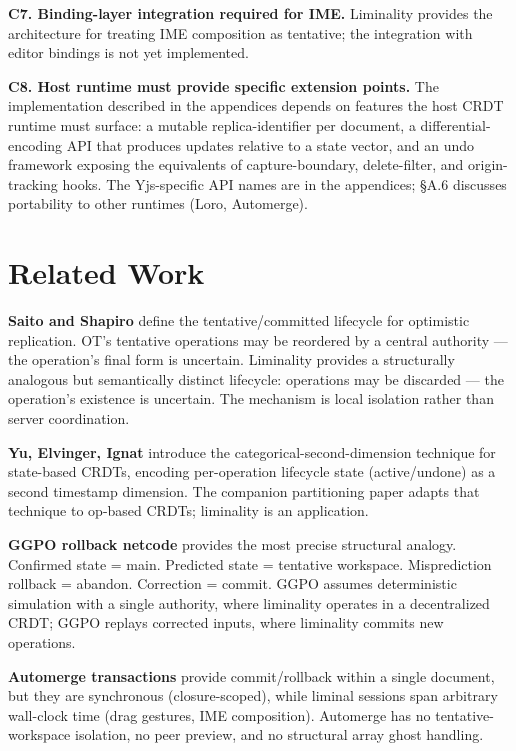 \textbf{C7. Binding-layer integration required for IME.} Liminality provides the architecture for treating IME composition as tentative; the integration with editor bindings is not yet implemented.

\textbf{C8. Host runtime must provide specific extension points.} The implementation described in the appendices depends on features the host CRDT runtime must surface: a mutable replica-identifier per document, a differential-encoding API that produces updates relative to a state vector, and an undo framework exposing the equivalents of capture-boundary, delete-filter, and origin-tracking hooks. The Yjs-specific API names are in the appendices; \S A.6 discusses portability to other runtimes (Loro, Automerge).

\section{Related Work}

\textbf{Saito and Shapiro} \cite{saito2005optimistic} define the tentative/committed lifecycle for optimistic replication. OT's tentative operations may be reordered by a central authority --- the operation's final form is uncertain. Liminality provides a structurally analogous but semantically distinct lifecycle: operations may be discarded --- the operation's existence is uncertain. The mechanism is local isolation rather than server coordination.

\textbf{Yu, Elvinger, Ignat} \cite{yu2019opodis} introduce the categorical-second-dimension technique for state-based CRDTs, encoding per-operation lifecycle state (active/undone) as a second timestamp dimension. The companion partitioning paper \cite{plexus:partitioning} adapts that technique to op-based CRDTs; liminality is an application.

\textbf{GGPO rollback netcode} \cite{ggpo} provides the most precise structural analogy. Confirmed state = main. Predicted state = tentative workspace. Misprediction rollback = abandon. Correction = commit. GGPO assumes deterministic simulation with a single authority, where liminality operates in a decentralized CRDT; GGPO replays corrected inputs, where liminality commits new operations.

\textbf{Automerge transactions} \cite{automerge:txn} provide commit/rollback within a single document, but they are synchronous (closure-scoped), while liminal sessions span arbitrary wall-clock time (drag gestures, IME composition). Automerge has no tentative-workspace isolation, no peer preview, and no structural array ghost handling.

